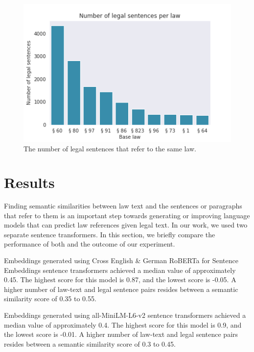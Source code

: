 \documentclass[runningheads]{llncs}
\begin{document}
\begin{figure}
    \centering
    \includegraphics[width=0.8\linewidth]{images/sent_per_law.png}
    \caption{The number of legal sentences that refer to the same law.}
    \label{fig:sent_per_law}
\end{figure} 


\section{Results}
\label{sec:results}

Finding semantic similarities between law text and the sentences or paragraphs that refer to them is an important step towards generating or improving language models that can predict law references given legal text. In our work, we used two separate sentence transformers. In this section, we briefly compare the performance of both and the outcome of our experiment.

Embeddings generated using Cross English \& German RoBERTa for Sentence Embeddings sentence transformers achieved a median value of approximately 0.45. The highest score for this model is 0.87, and the lowest score is -0.05. A higher number of law-text and legal sentence pairs resides between a semantic similarity score of 0.35 to 0.55.

Embeddings generated using all-MiniLM-L6-v2 sentence transformers achieved a median value of approximately 0.4. The highest score for this model is 0.9, and the lowest score is -0.01. A higher number of law-text and legal sentence pairs resides between a semantic similarity score of 0.3 to 0.45.
\end{document}
